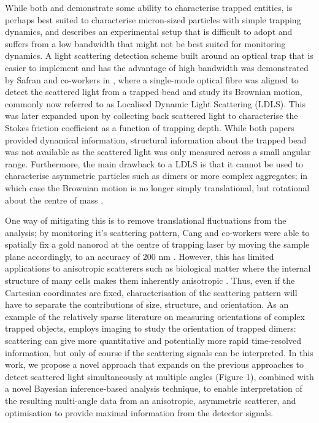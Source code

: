 \documentclass[preprint,  3p]{elsarticle}
\begin{document}
While both \cite{Carvalho_2023} and \cite{Watson_2023} demonstrate some ability to characterise trapped entities, \cite{Carvalho_2023} is perhaps best suited to characterise micron-sized particles with simple trapping dynamics, and \cite{Watson_2023} describes an experimental setup that is difficult to adopt and suffers from a low bandwidth that might not be best suited for monitoring dynamics. A light scattering detection scheme built around an optical trap that is easier to implement and has the advantage of high bandwidth was demonstrated by Safran and co-workers in \cite{Bar-Ziv_1998}, where a single-mode optical fibre was aligned to detect the scattered light from a trapped bead and study its Brownian motion, commonly now referred to as Localised Dynamic Light Scattering (LDLS). This was later expanded upon \cite{Viana2002} by collecting back scattered light to characterise the Stokes friction coefficient as a function of trapping depth. While both papers provided dynamical information, structural information about the trapped bead was not available as the scattered light was only measured across a small angular range. Furthermore, the main drawback to a LDLS is that it cannot be used to characterise asymmetric particles such as dimers or more complex aggregates; in which case the Brownian motion is no longer simply translational, but rotational about the centre of mass \cite{yin2013large}. 

One way of mitigating this is to remove translational fluctuations from the analysis; by monitoring it’s scattering pattern, Cang and co-workers were able to spatially fix a gold nanorod at the centre of trapping laser by moving the sample plane accordingly, to an accuracy of 200 nm \cite{Hu2006}. However, this has limited applications to anisotropic scatterers such as biological matter where the internal structure of many cells makes them inherently anisotropic \cite{Watson_2023}. Thus, even if the Cartesian coordinates are fixed, characterisation of the scattering pattern will have to separate the contributions of size, structure, and orientation.  As an example of the relatively sparse literature on measuring orientations of complex trapped objects, \cite{raudsepp2022estimating} employs imaging to study the orientation of trapped dimers: scattering can give more quantitative and potentially more rapid time-resolved information, but only of course if the scattering signals can be interpreted. In this work, we propose a novel approach that expands on the previous approaches \cite{Bar-Ziv_1998} \cite{Viana2002} to detect scattered light simultaneously at multiple angles (Figure 1), combined with a novel Bayesian inference-based analysis technique, to enable interpretation of the resulting multi-angle data from an anisotropic, asymmetric scatterer, and optimisation to provide maximal information from the detector signals. 
\end{document}
